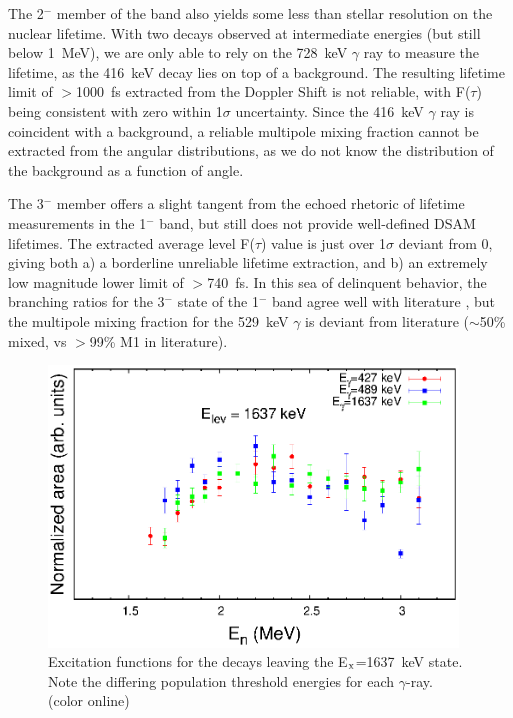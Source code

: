 The 2$^-$ member of the band also yields some less than stellar resolution on the nuclear lifetime. With two decays observed at intermediate energies (but still below 1~MeV), we are only able to rely on the 728~keV $\gamma$ ray to measure the lifetime, as the 416~keV decay lies on top of a background. The resulting lifetime limit of $>$1000~fs extracted from the Doppler Shift is not reliable, with F($\tau$) being consistent with zero within 1$\sigma$ uncertainty. Since the 416~keV $\gamma$ ray is coincident with a background, a reliable multipole mixing fraction cannot be extracted from the angular distributions, as we do not know the distribution of the background as a function of angle. 

The 3$^-$ member offers a slight tangent from the echoed rhetoric of lifetime measurements in the 1$^-$ band, but still does not provide well-defined DSAM lifetimes. The extracted average level F($\tau$) value is just over 1$\sigma$ deviant from 0, giving both a) a borderline unreliable lifetime extraction, and b) an extremely low magnitude lower limit of $>$740~fs. In this sea of delinquent behavior, the branching ratios for the 3$^-$ state of the 1$^-$ band agree well with literature \cite{Aprahamian200642}, but the multipole mixing fraction for the 529~keV $\gamma$ is deviant from literature ($\sim$50\% mixed, vs $>$99\% M1 in literature). %


\begin{figure}[h!]
\begin{center}
\includegraphics[width=0.97\textwidth]{figures/162Dy_1minus_ExF.eps}
\end{center}
\caption{Excitation functions for the decays leaving the E$_{\rm x}$=1637~keV state. Note the differing population threshold energies for each $\gamma$-ray. (color online)\label{fig:162Dy_ExF1637}}
\end{figure}

